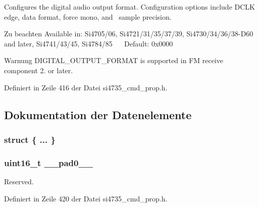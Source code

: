 Configures the digital audio output format. Configuration options include D\+C\+L\+K edge, data format, force mono, and~\newline
sample precision.

\begin{DoxyNote}{Zu beachten}
Available in\+: Si4705/06, Si4721/31/35/37/39, Si4730/34/36/38-\/\+D60 and later, Si4741/43/45, Si4784/85~\newline
~\newline
 Default\+: 0x0000
\end{DoxyNote}
\begin{DoxyWarning}{Warnung}
D\+I\+G\+I\+T\+A\+L\+\_\+\+O\+U\+T\+P\+U\+T\+\_\+\+F\+O\+R\+M\+A\+T is supported in F\+M receive component 2. or later. 
\end{DoxyWarning}


Definiert in Zeile 416 der Datei si4735\+\_\+cmd\+\_\+prop.\+h.



\subsection{Dokumentation der Datenelemente}
\hypertarget{uniondout__format_a040560dd5f1eb3229a6ef1ac567a73e4}{}\subsubsection[{"@43}]{\setlength{\rightskip}{0pt plus 5cm}struct \{ ... \} }\label{uniondout__format_a040560dd5f1eb3229a6ef1ac567a73e4}
\hypertarget{uniondout__format_a77132c2c26a75f5b8751b235cda23828}{}
\subsubsection[{\+\_\+\+\_\+pad0\+\_\+\+\_\+}]{\setlength{\rightskip}{0pt plus 5cm}uint16\+\_\+t \+\_\+\+\_\+pad0\+\_\+\+\_\+}\label{uniondout__format_a77132c2c26a75f5b8751b235cda23828}


Reserved. 



Definiert in Zeile 420 der Datei si4735\+\_\+cmd\+\_\+prop.\+h.

\hypertarget{uniondout__format_ab0549c1b5ea980a02e7eab77e21fea49}{}
